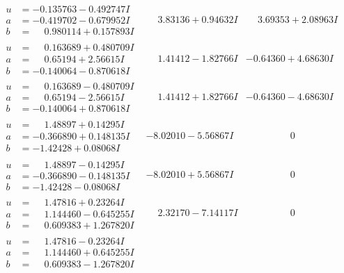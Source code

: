 \documentclass[1p]{elsarticle_modified}
\theoremstyle{definition}
\begin{document}
$$\begin{array}{c|c|c}
\begin{aligned}
u &= -0.135763 - 0.492747 I \\
a &= -0.419702 - 0.679952 I \\
b &= \phantom{-}0.980114 + 0.157893 I\end{aligned}
 & \phantom{-}3.83136 + 0.94632 I & \phantom{-}3.69353 + 2.08963 I \\ \hline\begin{aligned}
u &= \phantom{-}0.163689 + 0.480709 I \\
a &= \phantom{-}0.65194 + 2.56615 I \\
b &= -0.140064 - 0.870618 I\end{aligned}
 & \phantom{-}1.41412 - 1.82766 I & -0.64360 + 4.68630 I \\ \hline\begin{aligned}
u &= \phantom{-}0.163689 - 0.480709 I \\
a &= \phantom{-}0.65194 - 2.56615 I \\
b &= -0.140064 + 0.870618 I\end{aligned}
 & \phantom{-}1.41412 + 1.82766 I & -0.64360 - 4.68630 I \\ \hline\begin{aligned}
u &= \phantom{-}1.48897 + 0.14295 I \\
a &= -0.366890 + 0.148135 I \\
b &= -1.42428 + 0.08068 I\end{aligned}
 & -8.02010 - 5.56867 I & \phantom{-0.000000 } 0 \\ \hline\begin{aligned}
u &= \phantom{-}1.48897 - 0.14295 I \\
a &= -0.366890 - 0.148135 I \\
b &= -1.42428 - 0.08068 I\end{aligned}
 & -8.02010 + 5.56867 I & \phantom{-0.000000 } 0 \\ \hline\begin{aligned}
u &= \phantom{-}1.47816 + 0.23264 I \\
a &= \phantom{-}1.144460 - 0.645255 I \\
b &= \phantom{-}0.609383 + 1.267820 I\end{aligned}
 & \phantom{-}2.32170 - 7.14117 I & \phantom{-0.000000 } 0 \\ \hline\begin{aligned}
u &= \phantom{-}1.47816 - 0.23264 I \\
a &= \phantom{-}1.144460 + 0.645255 I \\
b &= \phantom{-}0.609383 - 1.267820 I\end{aligned}

\end{array}$$
\end{document}
